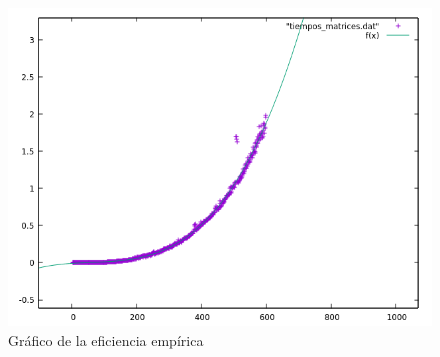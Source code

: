 \begin{figure}[H] %
\centering
\includegraphics[scale=0.8]{ejercicio7/plot.png}  
\caption{Gráfico de la eficiencia empírica} 
\label{fig:figura7-1}
\end{figure}


